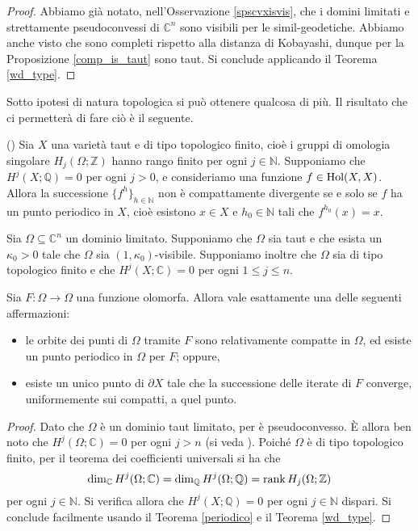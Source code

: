 \begin{proof}
    Abbiamo già notato, nell'Osservazione \ref{spscvxisvis}, che i domini limitati e strettamente pseudoconvessi di $\mathbb{C}^n$ sono visibili per le simil-geodetiche. Abbiamo anche visto che sono completi rispetto alla distanza di Kobayashi, dunque per la Proposizione \ref{comp_is_taut} sono taut. Si conclude applicando il Teorema \ref{wd_type}.
\end{proof}

Sotto ipotesi di natura topologica si può ottenere qualcosa di più. Il risultato che ci permetterà di fare ciò è il seguente.

\begin{thm} \label{periodico}
    (\cite[Theorem 0.4]{A2}) Sia $X$ una varietà taut e di tipo topologico finito, cioè i gruppi di omologia singolare $H_j(\Omega;\mathbb{Z})$ hanno rango finito per ogni $j\in\mathbb{N}$. Supponiamo che $H^j(X;\mathbb{Q})=0$ per ogni $j>0$, e consideriamo una funzione $f\in\textnormal{Hol}(X,X)$. Allora la successione $\{f^h\}_{h\in\mathbb{N}}$ non è compattamente divergente se e solo se $f$ ha un punto periodico in $X$, cioè esistono $x\in X$ e $h_0\in\mathbb{N}$ tali che $f^{h_0}(x)=x$.
\end{thm}

\begin{cor}
    Sia $\Omega\subseteq\mathbb{C}^n$ un dominio limitato. Supponiamo che $\Omega$ sia taut e che esista un $\kappa_0>0$ tale che $\Omega$ sia $(1,\kappa_0)$-visibile. Supponiamo inoltre che $\Omega$ sia di tipo topologico finito e che $H^j(X;\mathbb{C})=0$ per ogni $1\le j\le n$.

    Sia $F:\Omega\longrightarrow\Omega$ una funzione olomorfa. Allora vale esattamente una delle seguenti affermazioni:
    \begin{itemize}
        \item le orbite dei punti di $\Omega$ tramite $F$ sono relativamente compatte in $\Omega$, ed esiste un punto periodico in $\Omega$ per $F$; oppure,
        \item esiste un unico punto di $\partial X$ tale che la successione delle iterate di $F$ converge, uniformemente sui compatti, a quel punto.
    \end{itemize}
\end{cor}

\begin{proof}
    Dato che $\Omega$ è un dominio taut limitato, per \cite[Theorem F]{W} è pseudoconvesso. È allora ben noto che $H^j(\Omega;\mathbb{C})=0$ per ogni $j>n$ (si veda \cite[Theorema 4.2.7]{H}). Poiché $\Omega$ è di tipo topologico finito, per il teorema dei coefficienti universali si ha che
    $$\dim_{\mathbb{C}}{H^j(\Omega;\mathbb{C})}=\dim_{\mathbb{Q}}{H^j(\Omega;\mathbb{Q})}=\operatorname{rank}{H_j(\Omega;\mathbb{Z})}$$
    per ogni $j\in\mathbb{N}$. Si verifica allora che $H^j(X;\mathbb{Q})=0$ per ogni $j\in\mathbb{N}$ dispari. Si conclude facilmente usando il Teorema \ref{periodico} e il Teorema \ref{wd_type}.
\end{proof}